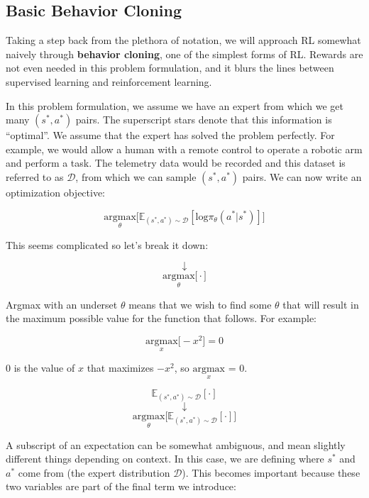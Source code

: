 \subsection{Basic Behavior Cloning}
\begin{flushleft}
    \large Taking a step back from the plethora of notation, we will approach RL somewhat naively through \textbf{behavior cloning}, one of the simplest forms of RL. Rewards are not even needed in this problem formulation, and it blurs the lines between supervised learning and reinforcement learning. \break

    In this problem formulation, we assume we have an expert from which we get many $(s^\ast, a^\ast)$ pairs. The superscript stars denote that this information is ``optimal''. We assume that the expert has solved the problem perfectly. For example, we would allow a human with a remote control to operate a robotic arm and perform a task. The telemetry data would be recorded and this dataset is referred to as $\mathcal{D}$, from which we can sample $(s^\ast, a^\ast)$ pairs. We can now write an optimization objective:

    $$\underset{\theta}{\textrm{argmax}}\biggl[\mathbb{E}_{(s^\ast,a^\ast) \sim \mathcal{D}}[\mathrm{log}\pi_\theta(a^\ast|s^\ast)]\biggr]$$

    This seems complicated so let's break it down:

    $$\downarrow$$
    $$\underset{\theta}{\textrm{argmax}}\biggl[ \cdot \biggr]$$

    Argmax with an underset $\theta$ means that we wish to find some $\theta$ that will result in the maximum possible value for the function that follows. For example:

    $$\underset{x}{\textrm{argmax}}\biggl[-x^2\biggr] = 0$$

    0 is the value of $x$ that maximizes $-x^2$, so $\underset{x}{\textrm{argmax}}$ = 0.
    
    $$\mathbb{E}_{(s^\ast,a^\ast) \sim \mathcal{D}}[\cdot]$$
    $$\downarrow$$
    $$\underset{\theta}{\textrm{argmax}}\biggl[ \mathbb{E}_{(s^\ast,a^\ast) \sim \mathcal{D}}[\cdot] \biggr]$$

   A subscript of an expectation can be somewhat ambiguous, and mean slightly different things depending on context. In this case, we are defining where $s^\ast$ and $a^\ast$ come from (the expert distribution $\mathcal{D}$). This becomes important because these two variables are part of the final term we introduce:


\end{flushleft}
